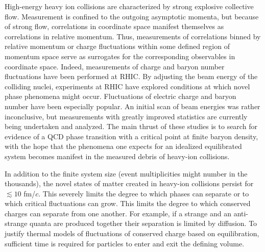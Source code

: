 High-energy heavy ion collisions are characterized by strong explosive collective flow. Measurement is confined to the outgoing asymptotic momenta, but because of strong flow, correlations in coordinate space manifest themselves as correlations in relative momentum. Thus, measurements of correlations binned by relative momentum or charge fluctuations within some defined region of momentum space serve as surrogates for the corresponding observables in coordinate space. Indeed, measurements of charge and baryon number fluctuations have been performed at RHIC. By adjusting the beam energy of the colliding nuclei, experiments at RHIC have explored conditions at which novel phase phenomena might occur. Fluctuations of electric charge and baryon number have been especially popular. An initial scan of beam energies \cite{Sarkar:2014fja,Xu:2016hxf,Thader:2016gpa,Luo:2012kja,Tarnowsky:2011vk,Aggarwal:2010wy,Chatterjee:2019msq,Adam:2019xmk,Adamczyk:2014fia,McDonald:2012ts,McDonald:2013aoa} was rather inconclusive, but measurements with greatly improved statistics are currently being undertaken and analyzed. The main thrust of these studies is to search for evidence of a QCD phase transition with a critical point at finite baryon density, with the hope that the phenomena one expects for an idealized equilibrated system \cite{Stephanov:1998dy,Stephanov:1999zu} becomes manifest in the measured debris of heavy-ion collisions.

In addition to the finite system size (event multiplicities might number in the thousands), the novel states of matter created in heavy-ion collisions persist for $\lesssim 10$ fm/$c$. This severely limits the degree to which phases can separate or to which critical fluctuations can grow. This limits the degree to which conserved charges can separate from one another. For example, if a strange and an anti-strange quanta are produced together their separation is limited by diffusion. To justify thermal models of fluctuations of conserved charge based on equilibration, sufficient time is required for particles to enter and exit the defining volume.

